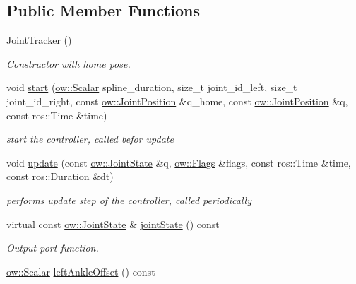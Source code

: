 \subsection*{Public Member Functions}
\begin{DoxyCompactItemize}
\item 
\hyperlink{classow__joint__tracker_1_1JointTracker_aa01ea595e844f9b38940dece444f90dc}{Joint\+Tracker} ()
\begin{DoxyCompactList}\small\item\em Constructor with home pose. \end{DoxyCompactList}\item 
void \hyperlink{classow__joint__tracker_1_1JointTracker_aac07fb25ccb7a05959a97eb24338b124}{start} (\hyperlink{types_8h_ac412879ee4a239c8032aa2d647f4a74a}{ow\+::\+Scalar} spline\+\_\+duration, size\+\_\+t joint\+\_\+id\+\_\+left, size\+\_\+t joint\+\_\+id\+\_\+right, const \hyperlink{classow__core_1_1JointPosition}{ow\+::\+Joint\+Position} \&q\+\_\+home, const \hyperlink{classow__core_1_1JointPosition}{ow\+::\+Joint\+Position} \&q, const ros\+::\+Time \&time)
\begin{DoxyCompactList}\small\item\em start the controller, called befor update \end{DoxyCompactList}\item 
void \hyperlink{classow__joint__tracker_1_1JointTracker_a15e2b8367666ee10605154af4d9e7182}{update} (const \hyperlink{classow__core_1_1JointState}{ow\+::\+Joint\+State} \&q, \hyperlink{classow__core_1_1Flags}{ow\+::\+Flags} \&flags, const ros\+::\+Time \&time, const ros\+::\+Duration \&dt)
\begin{DoxyCompactList}\small\item\em performs update step of the controller, called periodically \end{DoxyCompactList}\item 
virtual const \hyperlink{classow__core_1_1JointState}{ow\+::\+Joint\+State} \& \hyperlink{classow__joint__tracker_1_1JointTracker_af842785d3dc2da148bafc02b1164d159}{joint\+State} () const 
\begin{DoxyCompactList}\small\item\em Output port function. \end{DoxyCompactList}\item 
\hyperlink{types_8h_ac412879ee4a239c8032aa2d647f4a74a}{ow\+::\+Scalar} \hyperlink{classow__joint__tracker_1_1JointTracker_aab451e9ffc7206aee5a47f46e83c794e}{left\+Ankle\+Offset} () const 

\end{DoxyCompactItemize}
